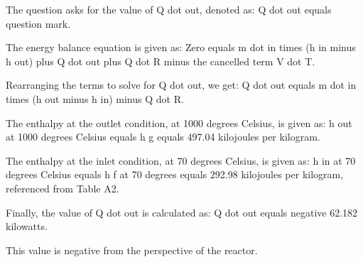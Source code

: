 The question asks for the value of Q dot out, denoted as:
Q dot out equals question mark.

The energy balance equation is given as:
Zero equals m dot in times (h in minus h out) plus Q dot out plus Q dot R minus the cancelled term V dot T.

Rearranging the terms to solve for Q dot out, we get:
Q dot out equals m dot in times (h out minus h in) minus Q dot R.

The enthalpy at the outlet condition, at 1000 degrees Celsius, is given as:
h out at 1000 degrees Celsius equals h g equals 497.04 kilojoules per kilogram.

The enthalpy at the inlet condition, at 70 degrees Celsius, is given as:
h in at 70 degrees Celsius equals h f at 70 degrees equals 292.98 kilojoules per kilogram, referenced from Table A2.

Finally, the value of Q dot out is calculated as:
Q dot out equals negative 62.182 kilowatts.

This value is negative from the perspective of the reactor.
